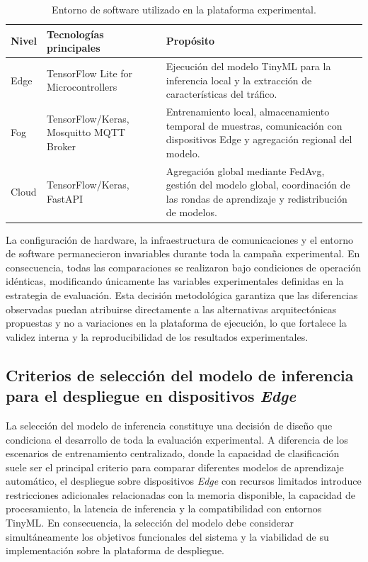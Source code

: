 \documentclass[journal,article,submit,moreauthors]{Definitions/mdpi}
\begin{document}
\begin{table}[ht]
\centering
\caption{Entorno de software utilizado en la plataforma experimental.}
\label{tab:software_environment}
\footnotesize
\begin{tabular}{l p{4.5cm}p{7cm}}
\toprule
\textbf{Nivel} &
\textbf{Tecnologías principales} &
\textbf{Propósito} \\
\midrule

Edge &
TensorFlow Lite for Microcontrollers &
Ejecución del modelo TinyML para la inferencia local y la extracción de características del tráfico. \\

Fog &
TensorFlow/Keras, Mosquitto MQTT Broker &
Entrenamiento local, almacenamiento temporal de muestras, comunicación con dispositivos Edge y agregación regional del modelo. \\

Cloud &
TensorFlow/Keras, FastAPI &
Agregación global mediante FedAvg, gestión del modelo global, coordinación de las rondas de aprendizaje y redistribución de modelos. \\

\bottomrule
\end{tabular}
\end{table}

La configuración de hardware, la infraestructura de comunicaciones y el entorno de software permanecieron invariables durante toda la campaña experimental. En consecuencia, todas las comparaciones se realizaron bajo condiciones de operación idénticas, modificando únicamente las variables experimentales definidas en la estrategia de evaluación. Esta decisión metodológica garantiza que las diferencias observadas puedan atribuirse directamente a las alternativas arquitectónicas propuestas y no a variaciones en la plataforma de ejecución, lo que fortalece la validez interna y la reproducibilidad de los resultados experimentales.

\subsection{Criterios de selección del modelo de inferencia para el despliegue en dispositivos \textit{Edge}}
La selección del modelo de inferencia constituye una decisión de diseño que condiciona el desarrollo de toda la evaluación experimental. A diferencia de los escenarios de entrenamiento centralizado, donde la capacidad de clasificación suele ser el principal criterio para comparar diferentes modelos de aprendizaje automático, el despliegue sobre dispositivos \textit{Edge} con recursos limitados introduce restricciones adicionales relacionadas con la memoria disponible, la capacidad de procesamiento, la latencia de inferencia y la compatibilidad con entornos TinyML. En consecuencia, la selección del modelo debe considerar simultáneamente los objetivos funcionales del sistema y la viabilidad de su implementación sobre la plataforma de despliegue.
\end{document}
